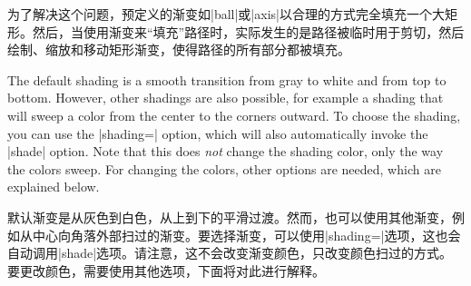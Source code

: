为了解决这个问题，预定义的渐变如|ball|或|axis|以合理的方式完全填充一个大矩形。然后，当使用渐变来“填充”路径时，实际发生的是路径被临时用于剪切，然后绘制、缩放和移动矩形渐变，使得路径的所有部分都被填充。

The default shading is a smooth transition from gray to white and from top to
bottom. However, other shadings are also possible, for example a shading that
will sweep a color from the center to the corners outward. To choose the
shading, you can use the |shading=| option, which will also automatically
invoke the |shade| option. Note that this does \emph{not} change the shading
color, only the way the colors sweep. For changing the colors, other options
are needed, which are explained below.

默认渐变是从灰色到白色，从上到下的平滑过渡。然而，也可以使用其他渐变，例如从中心向角落外部扫过的渐变。要选择渐变，可以使用|shading=|选项，这也会自动调用|shade|选项。请注意，这不会改变渐变颜色，只改变颜色扫过的方式。要更改颜色，需要使用其他选项，下面将对此进行解释。


